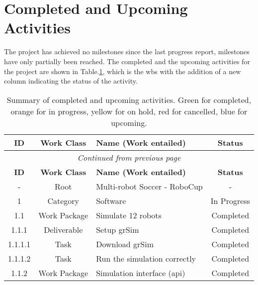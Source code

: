 \section{Completed and Upcoming Activities}

The project has achieved no milestones since the last progress report, milestones have only partially been reached.
The completed and the upcoming activities for the project are shown in Table.\:\ref{tab:activity_status}, which is the \ac{wbs} with the addition of a new column indicating the status of the activity.

\onecolumn
\begin{longtable}{|c|c|m{}|c|}
    \caption{Summary of completed and upcoming activities. Green for completed, orange for in progress, yellow for on hold, red for cancelled, blue for upcoming.} \label{tab:activity_status} \\
    \hline
    \textbf{ID} & \textbf{Work Class} & \textbf{Name (Work entailed)} & \textbf{Status} \\ \hline
    \endfirsthead
    \multicolumn{4}{|c|}{\textit{Continued from previous page}} \\ \hline
    \textbf{ID} & \textbf{Work Class} & \textbf{Name (Work entailed)} & \textbf{Status} \\ \hline
    \endhead
    \hline
    \endfoot
    \hline
    \hline
    \endlastfoot
    \rowcolor{na} - & Root & Multi-robot Soccer - RoboCup & - \\ \hline
    \rowcolor{p} 1 & Category & Software & In Progress \\ \hline
    \rowcolor{d} 1.1 & Work Package & Simulate 12 robots & Completed \\ \hline
    \rowcolor{d} 1.1.1 & Deliverable & Setup grSim & Completed \\ \hline
    \rowcolor{d} 1.1.1.1 & Task & Download grSim & Completed \\ \hline
    \rowcolor{d} 1.1.1.2 & Task & Run the simulation correctly & Completed \\ \hline
    \rowcolor{d} 1.1.2 & Work Package & Simulation interface (\acs{api}) & Completed \\ \hline

\end{longtable}
